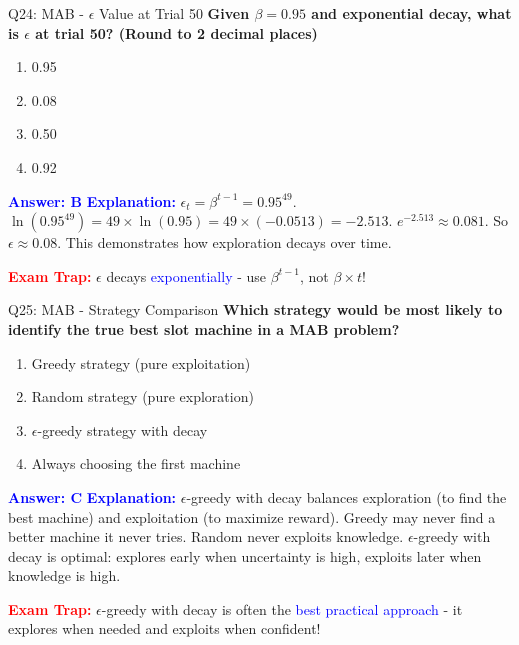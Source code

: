\documentclass[8pt]{beamer}
\begin{document}
	\begin{frame}{Q24: MAB - $\epsilon$ Value at Trial 50}
		\fontsize{6.5}{7.5}\selectfont
		\textbf{Given $\beta = 0.95$ and exponential decay, what is $\epsilon$ at trial 50? (Round to 2 decimal places)}
		
		\begin{enumerate}
			\item 0.95
			\item 0.08
			\item 0.50
			\item 0.92
		\end{enumerate}
		
		\vspace{0.1cm}
		\textcolor{blue}{\textbf{Answer: B}}
		\vspace{0.1cm}
		\textcolor{blue}{\textbf{Explanation:}} $\epsilon_t = \beta^{t-1} = 0.95^{49}$. $\ln(0.95^{49}) = 49 \times \ln(0.95) = 49 \times (-0.0513) = -2.513$. $e^{-2.513} \approx 0.081$. So $\epsilon \approx 0.08$. This demonstrates how exploration decays over time.
		
		\textcolor{red}{\textbf{Exam Trap:}} $\epsilon$ decays \textcolor{blue}{exponentially} - use $\beta^{t-1}$, not $\beta \times t$!
	\end{frame}
	
	\begin{frame}{Q25: MAB - Strategy Comparison}
		\fontsize{6.5}{7.5}\selectfont
		\textbf{Which strategy would be most likely to identify the true best slot machine in a MAB problem?}
		
		\begin{enumerate}
			\item Greedy strategy (pure exploitation)
			\item Random strategy (pure exploration)
			\item $\epsilon$-greedy strategy with decay
			\item Always choosing the first machine
		\end{enumerate}
		
		\vspace{0.1cm}
		\textcolor{blue}{\textbf{Answer: C}}
		\vspace{0.1cm}
		\textcolor{blue}{\textbf{Explanation:}} $\epsilon$-greedy with decay balances exploration (to find the best machine) and exploitation (to maximize reward). Greedy may never find a better machine it never tries. Random never exploits knowledge. $\epsilon$-greedy with decay is optimal: explores early when uncertainty is high, exploits later when knowledge is high.
		
		\textcolor{red}{\textbf{Exam Trap:}} $\epsilon$-greedy with decay is often the \textcolor{blue}{best practical approach} - it explores when needed and exploits when confident!
	\end{frame}
	
\end{document}
